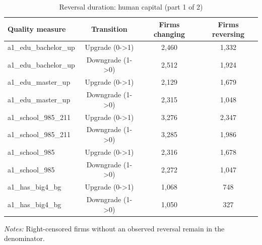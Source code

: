 \begin{table}[htbp]
\footnotesize
\centering
\caption{Reversal duration: human capital (part 1 of 2)}
\begin{threeparttable}
\begin{tabular}{p{}ccc}
\toprule
Quality measure & Transition & Firms changing & Firms reversing \\
\midrule
a1\_edu\_bachelor\_up & Upgrade (0->1) & 2,460 & 1,332 \\
a1\_edu\_bachelor\_up & Downgrade (1->0) & 2,512 & 1,924 \\
a1\_edu\_master\_up & Upgrade (0->1) & 2,129 & 1,679 \\
a1\_edu\_master\_up & Downgrade (1->0) & 2,315 & 1,048 \\
a1\_school\_985\_211 & Upgrade (0->1) & 3,276 & 2,347 \\
a1\_school\_985\_211 & Downgrade (1->0) & 3,285 & 1,986 \\
a1\_school\_985 & Upgrade (0->1) & 2,316 & 1,678 \\
a1\_school\_985 & Downgrade (1->0) & 2,272 & 1,047 \\
a1\_has\_big4\_bg & Upgrade (0->1) & 1,068 & 748 \\
a1\_has\_big4\_bg & Downgrade (1->0) & 1,050 & 327 \\
\bottomrule
\end{tabular}
\begin{tablenotes}\footnotesize
\item \raggedright \textit{Notes:} Right-censored firms without an observed reversal remain in the denominator.
\end{tablenotes}
\end{threeparttable}
\end{table}

